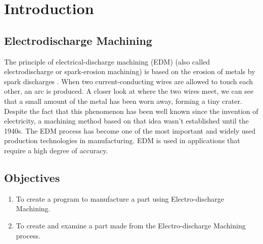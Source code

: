 \chapter{Introduction}
\lhead{\leftmark}
\label{sec:introduction}
\section{Electrodischarge Machining}
The principle of electrical-discharge machining (EDM) (also called electrodischarge or spark-erosion machining) is based on the erosion of metals by spark discharges \cite{classnotes}. When two current-conducting wires are allowed to touch each other, an arc is produced. A closer look at where the two wires meet, we can see that a small amount of the metal has been worn away, forming a tiny crater.\\
Despite the fact that this phenomenon has been well known since the invention of electricity, a machining method based on that idea wasn't established until the 1940s. The EDM process has become one of the most important and widely used production technologies in manufacturing\cite{youssef2020non}. EDM is used in applications that require a high degree of accuracy\cite{youssef2020non}.
\section{Objectives}
\begin{enumerate}
\item To create a program to manufacture a part using Electro-discharge Machining.
\item To create and examine a part made from the Electro-discharge Machining process.
\end{enumerate}
